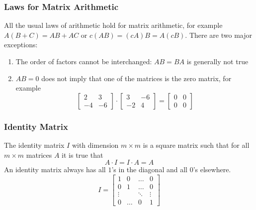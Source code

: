 \documentclass[xcolor=dvipsnames]{beamer}
\begin{document}
\begin{frame}
  \frametitle{Laws for Matrix Arithmetic}
  All the usual laws of arithmetic hold for matrix arithmetic, for
  example $A(B+C)=AB+AC$ or $c(AB)=(cA)B=A(cB)$. There are two major
  exceptions:
  \begin{enumerate}
  \item The order of factors cannot be interchanged: $AB=BA$ is
    generally not true
  \item $AB=0$ does not imply that one of the matrices is the zero
    matrix, for example
    \begin{equation}
      \label{eq:equaewoi}
      \left[
        \begin{array}{cc}
          2 & 3 \\
          -4 & -6
        \end{array}\right]\cdot\left[
        \begin{array}{cc}
          3 & -6 \\
          -2 & 4
        \end{array}\right]=\left[
        \begin{array}{cc}
          0 & 0 \\
          0 & 0
        \end{array}\right]
    \end{equation}
  \end{enumerate}
\end{frame}

\begin{frame}
  \frametitle{Identity Matrix}
The \alert{identity matrix} $I$ with dimension $m\times{}m$ is a square matrix
such that for all $m\times{}m$ matrices $A$ it is true that
\begin{equation}
  \label{eq:aivaitoa}
  A\cdot{}I=I\cdot{}A=A
\end{equation}
An identity matrix always has all $1$'s in the diagonal and all $0$'s
elsewhere.
\begin{equation}
  \label{eq:ubaisula}
  I=\left[
    \begin{array}{cccc}
      1 & 0 & \ldots & 0 \\
      0 & 1 & \ldots & 0 \\
      \vdots & & \ddots & \vdots \\
      0 & \ldots & 0 & 1
    \end{array}\right]
\end{equation}
\end{frame}
\end{document}

